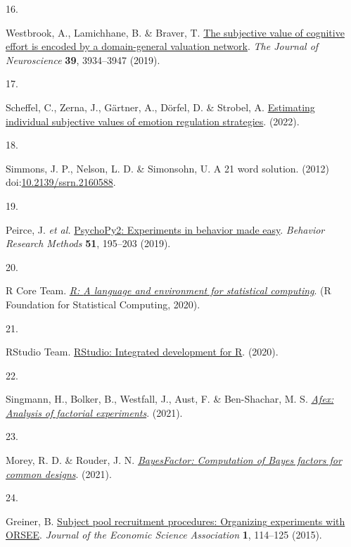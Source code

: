 \documentclass[
  man,floatsintext]{apa6}
\newlength{\cslhangindent}
\newlength{\csllabelwidth}
\newlength{\cslentryspacingunit} %
\newenvironment{CSLReferences}[2] %
 {%
  \setlength{\parindent}{0pt}
  \ifodd #1
  \let\oldpar\par
  \def\par{\hangindent=\cslhangindent\oldpar}
  \fi
  \setlength{\parskip}{#2\cslentryspacingunit}
 }%
 {}
\newcommand{\CSLLeftMargin}[1]{\parbox[t]{\csllabelwidth}{#1}}
\newcommand{\CSLRightInline}[1]{\parbox[t]{\linewidth - \csllabelwidth}{#1}\break}
\begin{document}
\begin{CSLReferences}{0}{0}
\leavevmode{}%
\CSLLeftMargin{16. }%
\CSLRightInline{Westbrook, A., Lamichhane, B. \& Braver, T. \href{https://doi.org/10.1523/jneurosci.3071-18.2019}{The subjective value of cognitive effort is encoded by a domain-general valuation network}. \emph{The Journal of Neuroscience} \textbf{39}, 3934--3947 (2019).}

\leavevmode{}%
\CSLLeftMargin{17. }%
\CSLRightInline{Scheffel, C., Zerna, J., Gärtner, A., Dörfel, D. \& Strobel, A. \href{https://psyarxiv.com/wr8qx}{Estimating individual subjective values of emotion regulation strategies}. (2022).}

\leavevmode{}%
\CSLLeftMargin{18. }%
\CSLRightInline{Simmons, J. P., Nelson, L. D. \& Simonsohn, U. A 21 word solution. (2012) doi:\href{https://doi.org/10.2139/ssrn.2160588}{10.2139/ssrn.2160588}.}

\leavevmode{}%
\CSLLeftMargin{19. }%
\CSLRightInline{Peirce, J. \emph{et al.} \href{https://doi.org/10.3758/s13428-018-01193-y}{{PsychoPy2}: {Experiments} in behavior made easy}. \emph{Behavior Research Methods} \textbf{51}, 195--203 (2019).}

\leavevmode{}%
\CSLLeftMargin{20. }%
\CSLRightInline{R Core Team. \emph{\href{https://www.R-project.org/}{R: {A} language and environment for statistical computing}}. (R Foundation for Statistical Computing, 2020).}

\leavevmode{}%
\CSLLeftMargin{21. }%
\CSLRightInline{RStudio Team. \href{http://www.rstudio.com}{{RStudio}: {Integrated} development for {R}}. (2020).}

\leavevmode{}%
\CSLLeftMargin{22. }%
\CSLRightInline{Singmann, H., Bolker, B., Westfall, J., Aust, F. \& Ben-Shachar, M. S. \emph{\href{https://CRAN.R-project.org/package=afex}{Afex: {A}nalysis of factorial experiments}}. (2021).}

\leavevmode{}%
\CSLLeftMargin{23. }%
\CSLRightInline{Morey, R. D. \& Rouder, J. N. \emph{\href{https://CRAN.R-project.org/package=BayesFactor}{{BayesFactor}: {Computation} of {Bayes} factors for common designs}}. (2021).}

\leavevmode{}%
\CSLLeftMargin{24. }%
\CSLRightInline{Greiner, B. \href{https://doi.org/10.1007/s40881-015-0004-4}{Subject pool recruitment procedures: {Organizing} experiments with {ORSEE}}. \emph{Journal of the Economic Science Association} \textbf{1}, 114--125 (2015).}


\end{CSLReferences}
\end{document}
